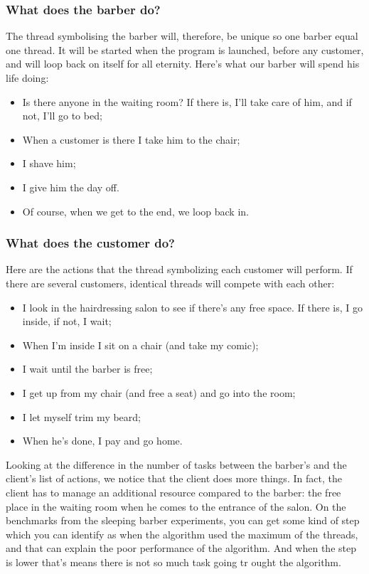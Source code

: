 \documentclass{article}
\begin{document}
\subsubsection{ What does the barber do?}
The thread symbolising the barber will, therefore, be unique so one barber equal one thread. It will be started when the program is launched, before any customer, and will loop back on itself for all eternity.
Here's what our barber will spend his life doing:

\begin{itemize}
    \item Is there anyone in the waiting room? If there is, I'll take care of him, and if not, I'll go to bed;
    \item When a customer is there I take him to the chair;
    \item I shave him;
    \item I give him the day off.
    \item Of course, when we get to the end, we loop back in.
\end{itemize}

\subsubsection{ What does the customer do?}

Here are the actions that the thread symbolizing each customer will perform. If there are several customers, identical threads will compete with each other:

\begin{itemize}
    \item I look in the hairdressing salon to see if there's any free space. If there is, I go inside, if not, I wait;
    \item When I'm inside I sit on a chair (and take my comic);
    \item I wait until the barber is free;
    \item I get up from my chair (and free a seat) and go into the room;
    \item I let myself trim my beard;
    \item When he's done, I pay and go home.
\end{itemize}

Looking at the difference in the number of tasks between the barber's and the client's list of actions, we notice that the client does more things. In fact, the client has to manage an additional resource compared to the barber: the free place in the waiting room when he comes to the entrance of the salon. On the benchmarks from the sleeping barber experiments, you can get some kind of step which you can identify as when the algorithm used the maximum of the threads, and that can explain the poor performance of the algorithm. And when the step is lower that's means there is not so much task going tr ought the algorithm.
\end{document}
